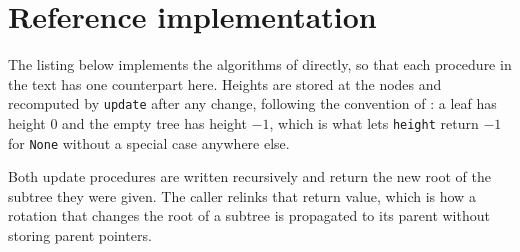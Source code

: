 \section{Reference implementation}
\label{app:impl}

The listing below implements the algorithms of
 directly, so that each
procedure in the text has one counterpart here. Heights are stored at the nodes
and recomputed by \texttt{update} after any change, following the convention of
: a leaf has height $0$ and the empty tree has height $-1$,
which is what lets \texttt{height} return $-1$ for \texttt{None} without a
special case anywhere else.

Both update procedures are written recursively and return the new root of the
subtree they were given. The caller relinks that return value, which is how a
rotation that changes the root of a subtree is propagated to its parent without
storing parent pointers.


